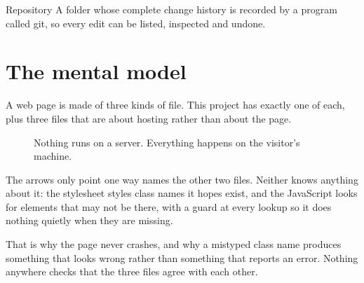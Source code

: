 \documentclass[11pt,a4paper]{article}
\begin{document}
\begin{jargon}{Repository}
A folder whose complete change history is recorded by a program called git, so
every edit can be listed, inspected and undone.
\end{jargon}

\section{The mental model}

A web page is made of three kinds of file. This project has exactly one of each,
plus three files that are about hosting rather than about the page.

\begin{figure}[H]\centering
{}
\caption{Nothing runs on a server. Everything happens on the visitor's machine.}
\end{figure}

\begin{keyidea}{The arrows only point one way}
 names the other two files. Neither knows anything about it: the
stylesheet styles class names it hopes exist, and the JavaScript looks for
elements that may not be there, with a guard at every lookup so it does nothing
quietly when they are missing.

That is why the page never crashes, and why a mistyped class name produces
something that looks wrong rather than something that reports an error. Nothing
anywhere checks that the three files agree with each other.
\end{keyidea}
\end{document}
